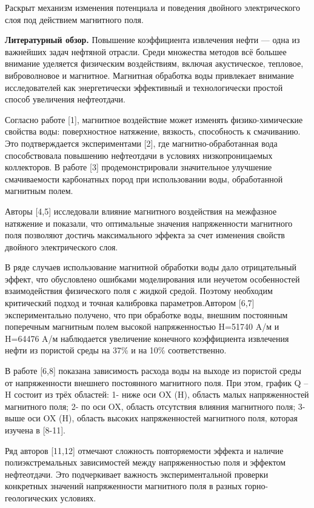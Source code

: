 {{Раскрыт механизм изменения потенциала и поведения двойного
электрического слоя под действием магнитного поля.

{\bfseries Литературный обзор.} Повышение коэффициента извлечения нефти ---
одна из важнейших задач нефтяной отрасли. Среди множества методов всё
большее внимание уделяется физическим воздействиям, включая
акустическое, тепловое, виброволновое и магнитное. Магнитная обработка
воды привлекает внимание исследователей как энергетически эффективный и
технологически простой способ увеличения нефтеотдачи.

Согласно работе {[}1{]}, магнитное воздействие может изменять
физико-химические свойства воды: поверхностное натяжение, вязкость,
способность к смачиванию. Это подтверждается экспериментами {[}2{]}, где
магнитно-обработанная вода способствовала повышению нефтеотдачи в
условиях низкопроницаемых коллекторов. В работе {[}3{]}
продемонстрировали значительное улучшение смачиваемости карбонатных
пород при использовании воды, обработанной магнитным полем.

Авторы {[}4,5{]} исследовали влияние магнитного воздействия на межфазное
натяжение и показали, что оптимальные значения напряженности магнитного
поля позволяют достичь максимального эффекта за счет изменения свойств
двойного электрического слоя.

В ряде случаев использование магнитной обработки воды дало отрицательный
эффект, что обусловлено ошибками моделирования или неучетом особенностей
взаимодействия физического поля с жидкой средой. Поэтому необходим
критический подход и точная калибровка параметров.Автором {[}6,7{]}
экспериментально получено, что при обработке воды, внешним постоянным
поперечным магнитным полем высокой напряженностью H=51740 A/м и H=64476
A/м наблюдается увеличение конечного коэффициента извлечения нефти из
пористой среды на 37\% и на 10\% соответственно.

В работе {[}6,8{]} показана зависимость расхода воды на выходе из
пористой среды от напряженности внешнего постоянного магнитного поля.
При этом, график Q -- H состоит из трёх областей: 1- ниже оси OX (H),
область малых напряженностей магнитного поля; 2- по оси OX, область
отсутствия влияния магнитного поля; 3- выше оси OX (H), область высоких
напряженностей магнитного поля, которая изучена в {[}8-11{]}.

Ряд авторов {[}11,12{]} отмечают сложность повторяемости эффекта и
наличие полиэкстремальных зависимостей между напряженностью поля и
эффектом нефтеотдачи. Это подчеркивает важность экспериментальной
проверки конкретных значений напряженности магнитного поля в разных
горно-геологических условиях.

}}
